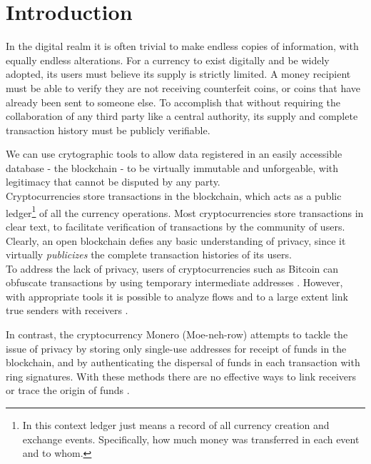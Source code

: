 \chapter{Introduction}
\label{chap:introduction}

In the digital realm it is often trivial to make endless copies of information, with equally endless alterations. For a currency to exist digitally and be widely adopted, its users must believe its supply is strictly limited. A money recipient must be able to verify they are not receiving counterfeit coins, or coins that have already been sent to someone else. To accomplish that without requiring the collaboration of any third party like a central authority, its supply and complete transaction history must be publicly verifiable.

We can use crytographic tools to allow data registered in an easily accessible database - the blockchain - to be virtually immutable and unforgeable, with legitimacy that cannot be disputed by any party.
\\ \newline
Cryptocurrencies store transactions in the blockchain, which acts as a public ledger\footnote{In this context ledger just means a record of all currency creation and exchange events. Specifically, how much money was transferred in each event and to whom.} of all the currency operations. Most cryptocurrencies store transactions in clear text, to facilitate verification of transactions by the community of users.
\\ \newline
Clearly, an open blockchain defies any basic understanding of privacy, since it virtually {\em publicizes} the complete transaction histories of its users.
\\ \newline
To address the lack of privacy, users of cryptocurrencies such as Bitcoin can obfuscate transactions by using temporary intermediate addresses \cite{DBLP:journals/corr/NarayananM17}. However, with appropriate tools it is possible to analyze flows and to a large extent link true senders with receivers \cite{DBLP:journals/corr/ShenTuY15b, DK-police-tracing-btc, Andrew-Cox-Sandia}.

In contrast, the cryptocurrency Monero (Moe-neh-row) attempts to tackle the issue of privacy by storing only single-use addresses for receipt of funds in the blockchain, and by authenticating the dispersal of funds in each transaction with ring signatures. With these methods there are no effective ways to link receivers or trace the origin of funds \cite{Monero-intro}.

